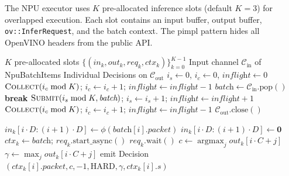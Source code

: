 \documentclass[11pt,a4paper,twoside]{article}
\theoremstyle{definition}
\theoremstyle{remark}
\newcommand{\argmax}{\operatorname{argmax}}
\newcommand{\vect}[1]{\mathbf{#1}}
\begin{document}
The NPU executor uses $K$ pre-allocated inference slots (default $K = 3$) for overlapped execution. Each slot contains an input buffer, output buffer, \texttt{ov::InferRequest}, and the batch context. The pimpl pattern hides all OpenVINO headers from the public API.

\begin{algorithm}[H]
\caption{\textsc{NpuExecutorAsync}: $K$-slot async inference}
\label{alg:npu-async}
\begin{algorithmic}[1]
\Require $K$ pre-allocated slots $\{(\textit{in}_k, \textit{out}_k, \textit{req}_k, \textit{ctx}_k)\}_{k=0}^{K-1}$
\Require Input channel $\mathcal{C}_{\text{in}}$ of NpuBatchItems
\Ensure Individual Decisions on $\mathcal{C}_{\text{out}}$
\State $i_s \gets 0$, $i_c \gets 0$, $\textit{inflight} \gets 0$
\Loop
    \State $\textsc{Collect}(i_c \bmod K)$; $i_c \gets i_c + 1$; $\textit{inflight} \gets \textit{inflight} - 1$
  \EndIf
  \State $\textit{batch} \gets \mathcal{C}_{\text{in}}.\text{pop}()$
   \textbf{break} \EndIf
  \State $\textsc{Submit}(i_s \bmod K, \textit{batch})$; $i_s \gets i_s + 1$; $\textit{inflight} \gets \textit{inflight} + 1$
\EndLoop
{} 
  \State $\textsc{Collect}(i_c \bmod K)$; $i_c \gets i_c + 1$; $\textit{inflight} \gets \textit{inflight} - 1$
\EndWhile
\State $\mathcal{C}_{\text{out}}.\text{close}()$
\end{algorithmic}
\end{algorithm}

\begin{algorithm}[H]
\caption{$\textsc{Submit}(k, \textit{batch})$ and $\textsc{Collect}(k)$}
\begin{algorithmic}[1]
    \State $\textit{in}_k[i \cdot D : (i+1) \cdot D] \gets \phi(\textit{batch}[i].\textit{packet})$ 
  \EndFor
    \State $\textit{in}_k[i \cdot D : (i+1) \cdot D] \gets \vect{0}$ 
  \EndFor
  \State $\textit{ctx}_k \gets \textit{batch}$; $\textit{req}_k.\text{start\_async}()$
\EndProcedure
{}
  \State $\textit{req}_k.\text{wait}()$
    \State $c \gets \argmax_{j} \textit{out}_k[i \cdot C + j]$
    \State $\gamma \gets \max_{j} \textit{out}_k[i \cdot C + j]$
    \State emit Decision$(\textit{ctx}_k[i].\textit{packet}, c, -1, \text{HARD}, \gamma, \textit{ctx}_k[i].s)$
  \EndFor
\EndProcedure
\end{algorithmic}
\end{algorithm}
\end{document}
